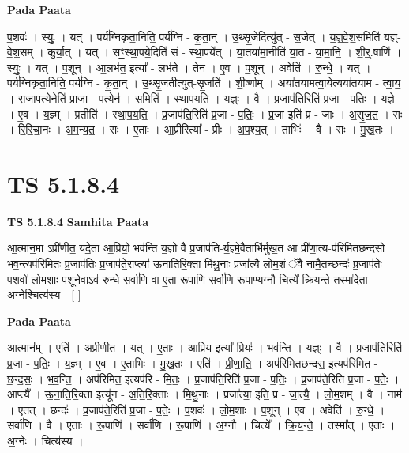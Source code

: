 \documentclass[17pt]{extarticle}
\begin{document}
\textbf{Pada Paata} \newline

प॒शवः॑ । स्युः॒ । यत् । पर्य॑ग्निकृता॒निति॒ पर्य॑ग्नि - कृ॒ता॒न् । उ॒थ्सृ॒जेदित्यु॑त् - स॒जेत् । य॒ज्ञ्॒वे॒श॒समिति॑ यज्ञ्-वे॒श॒सम् । कु॒र्या॒त् । यत् । सꣳ॒॒स्था॒पये॒दिति॑ सं - स्था॒पये᳚त् । या॒तया॑मा॒नीति॑ या॒त - या॒मा॒नि॒ । शी॒र्॒.षाणि॑ । स्युः॒ । यत् । प॒शून् । आ॒लभ॑त॒ इत्या᳚ - लभ॑ते । तेन॑ । ए॒व । प॒शून् । अवेति॑ । रु॒न्धे॒ । यत् । पर्य॑ग्निकृता॒निति॒ पर्य॑ग्नि - कृ॒ता॒न् । उ॒थ्सृ॒जतीत्यु॑त्-सृ॒जति॑ । शी॒र्ष्णाम् । अया॑तयामत्वा॒येत्यया॑तयाम - त्वा॒य॒ । रा॒जा॒प॒त्येनेति॑ प्राजा - प॒त्येन॑ । समिति॑ । स्था॒प॒य॒ति॒ । य॒ज्ञ्ः । वै । प्र॒जाप॑ति॒रिति॑ प्र॒जा - प॒तिः॒ । य॒ज्ञे । ए॒व । य॒ज्ञ्म् । प्रतीति॑ । स्था॒प॒य॒ति॒ । प्र॒जाप॑ति॒रिति॑ प्र॒जा - प॒तिः॒ । प्र॒जा इति॑ प्र - जाः । अ॒सृ॒ज॒त॒ । सः । रि॒रि॒चा॒नः । अ॒म॒न्य॒त॒ । सः । ए॒ताः । आ॒प्रीरित्या᳚ - प्रीः । अ॒प॒श्य॒त् । ताभिः॑ । वै । सः । मु॒ख॒तः ।  \newline





\section{ TS 5.1.8.4 }

\textbf{TS 5.1.8.4 } \newline
\textbf{Samhita Paata} \newline

आ॒त्मान॒मा ऽप्री॑णीत॒ यदे॒ता आ॒प्रियो॒ भव॑न्ति य॒ज्ञो वै प्र॒जाप॑ति-र्य॒ज्ञ्मे॒वैताभि॑र्मुख॒त आ प्री॑णा॒त्य-प॑रिमितछन्दसो भव॒न्त्यप॑रिमितः प्र॒जाप॑तिः प्र॒जाप॑ते॒राप्त्या॑ ऊनातिरि॒क्ता मि॑थु॒नाः प्रजा᳚त्यै लोम॒शं ॅवै नामै॒तच्छन्दः॑ प्र॒जाप॑तेः प॒शवो॑ लोम॒शाः प॒शूने॒वाऽव॑ रुन्धे॒ सर्वा॑णि॒ वा ए॒ता रू॒पाणि॒ सर्वा॑णि रू॒पाण्य॒ग्नौ चित्ये᳚ क्रियन्ते॒ तस्मा॑दे॒ता अ॒ग्नेश्चित्य॑स्य - [  ] \newline

\textbf{Pada Paata} \newline

आ॒त्मान᳚म् । एति॑ । अ॒प्री॒णी॒त॒ । यत् । ए॒ताः । आ॒प्रिय॒ इत्या᳚-प्रियः॑ । भव॑न्ति । य॒ज्ञ्ः । वै । प्र॒जाप॑ति॒रिति॑ प्र॒जा - प॒तिः॒ । य॒ज्ञ्म् । ए॒व । ए॒ताभिः॑ । मु॒ख॒तः । एति॑ । प्री॒णा॒ति॒ । अप॑रिमितछन्दस॒ इत्यप॑रिमित - छ॒न्द॒सः॒ । भ॒व॒न्ति॒ । अप॑रिमित॒ इत्यप॑रि - मि॒तः॒ । प्र॒जाप॑ति॒रिति॑ प्र॒जा - प॒तिः॒ । प्र॒जाप॑ते॒रिति॑ प्र॒जा - प॒तेः॒ । आप्त्यै᳚ । ऊ॒ना॒ति॒रि॒क्ता इत्यू॑न - अ॒ति॒रि॒क्ताः । मि॒थु॒नाः । प्रजा᳚त्या॒ इति॒ प्र - जा॒त्यै॒ । लो॒म॒शम् । वै । नाम॑ । ए॒तत् । छन्दः॑ । प्र॒जाप॑ते॒रिति॑ प्र॒जा - प॒तेः॒ । प॒शवः॑ । लो॒म॒शाः । प॒शून् । ए॒व । अवेति॑ । रु॒न्धे॒ । सर्वा॑णि । वै । ए॒ताः । रू॒पाणि॑ । सर्वा॑णि । रू॒पाणि॑ । अ॒ग्नौ । चित्ये᳚ । क्रि॒य॒न्ते॒ । तस्मा᳚त् । ए॒ताः । अ॒ग्नेः । चित्य॑स्य ।  \newline
\end{document}
